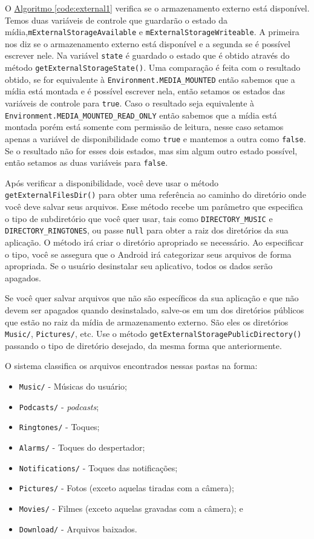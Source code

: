 \documentclass[a4paper,12pt,brazil,oneside]{book}
\begin{document}
\begin{singlespace}
		O \hyperref[code:external1]{Algoritmo \ref*{code:external1}} verifica se o armazenamento externo está disponível. Temos duas variáveis de controle que guardarão o estado da mídia,\texttt{mExternalStorageAvailable} e \texttt{mExternalStorageWriteable}. A primeira nos diz se o armazenamento externo está disponível e a segunda se é possível escrever nele. Na variável \texttt{state} é guardado o estado que é obtido através do método \texttt{getExternalStorageState()}. Uma comparação é feita com o resultado obtido, se for equivalente à \texttt{Environment.MEDIA\_MOUNTED} então sabemos que a mídia está montada e é possível escrever nela, então setamos os estados das variáveis de controle para \texttt{true}. Caso o resultado seja equivalente à \texttt{Environment.MEDIA\_MOUNTED\_READ\_ONLY} então sabemos que a mídia está montada porém está somente com permissão de leitura, nesse caso setamos apenas a variável de disponibilidade como \texttt{true} e mantemos a outra como \texttt{false}. Se o resultado não for esses dois estados, mas sim algum outro estado possível, então setamos as duas variáveis para \texttt{false}.

		Após verificar a disponibilidade, você deve usar o método \texttt{getExternalFilesDir()} para obter uma referência ao caminho do diretório onde você deve salvar seus arquivos. Esse método recebe um parâmetro que especifica o tipo de subdiretório que você quer usar, tais como \texttt{DIRECTORY\_MUSIC} e \texttt{DIRECTORY\_RINGTONES}, ou passe \texttt{null} para obter a raiz dos diretórios da sua aplicação. O método irá criar o diretório apropriado se necessário. Ao especificar o tipo, você se assegura que o Android irá categorizar seus arquivos de forma apropriada. Se o usuário desinstalar seu aplicativo, todos os dados serão apagados.

		Se você quer salvar arquivos que não são específicos da sua aplicação e que não devem ser apagados quando desinstalado, salve-os em um dos diretórios públicos que estão no raiz da mídia de armazenamento externo. São eles os diretórios \texttt{Music/}, \texttt{Pictures/}, etc. Use o método \texttt{getExternalStoragePublicDirectory()} passando o tipo de diretório desejado, da mesma forma que anteriormente.

		O sistema classifica os arquivos encontrados nessas pastas na forma:

		\begin{itemize}
			\item \texttt{Music/} - Músicas do usuário;
			\item \texttt{Podcasts/} - \emph{podcasts};
			\item \texttt{Ringtones/} - Toques;
			\item \texttt{Alarms/} - Toques do despertador;
			\item \texttt{Notifications/} - Toques das notificações;
			\item \texttt{Pictures/} - Fotos (exceto aquelas tiradas com a câmera);
			\item \texttt{Movies/} - Filmes (exceto aquelas gravadas com a câmera); e
			\item \texttt{Download/} - Arquivos baixados.
		\end{itemize}


\end{singlespace}
\end{document}
